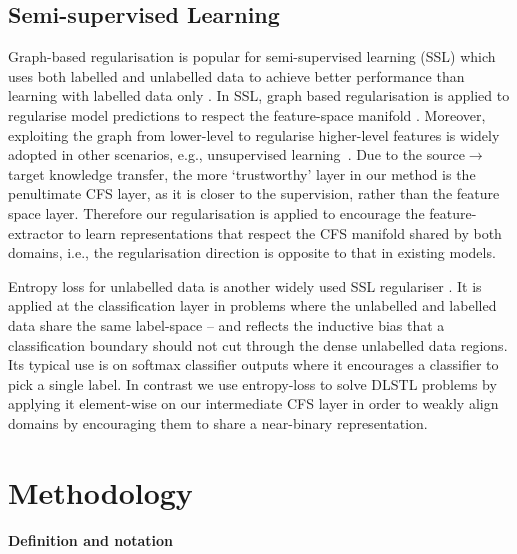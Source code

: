 \documentclass[letterpaper]{article} \usepackage{aaai19}  \usepackage{times}  \usepackage{helvet}  \usepackage{courier}  \usepackage{url}  \usepackage{graphicx}
\begin{document}
\subsection{Semi-supervised Learning}
Graph-based regularisation is popular for semi-supervised learning (SSL) which uses both labelled and unlabelled data to achieve better performance than learning with labelled data only \cite{zhu2006semi,belkin2006laprlsSSL}. 
In SSL,
graph based regularisation is applied to regularise model predictions to respect the feature-space manifold \cite{yue2017semi,nadler2009semi,belkin2006laprlsSSL}. 
Moreover, exploiting the graph from lower-level to regularise higher-level features is widely adopted in other scenarios, e.g., unsupervised learning~\cite{jia2015laplacian,yang2017graph}.
Due to the source$\to$target knowledge transfer, the more `trustworthy' layer in our method is the penultimate CFS layer, as it is closer to the supervision, rather than the feature space layer. 
Therefore our regularisation is applied to encourage the feature-extractor to learn representations that respect the CFS manifold shared by both domains, i.e., the regularisation direction is opposite to that in existing models.

Entropy loss for unlabelled data is another widely used SSL regulariser \cite{zhu2006semi,long2016unsupervised}. It is applied at the classification layer in problems where the unlabelled and labelled data share the same label-space -- and reflects the inductive bias that a classification boundary should not cut through the dense unlabelled data regions. Its typical use is on softmax classifier outputs where it encourages a classifier to pick a single label. In contrast we use entropy-loss to solve DLSTL problems by applying it  element-wise on our intermediate CFS layer in order to weakly align domains by encouraging them to share a near-binary representation. 



\section{Methodology}\label{Sec:Method}

\paragraph{Definition and notation}
\end{document}
